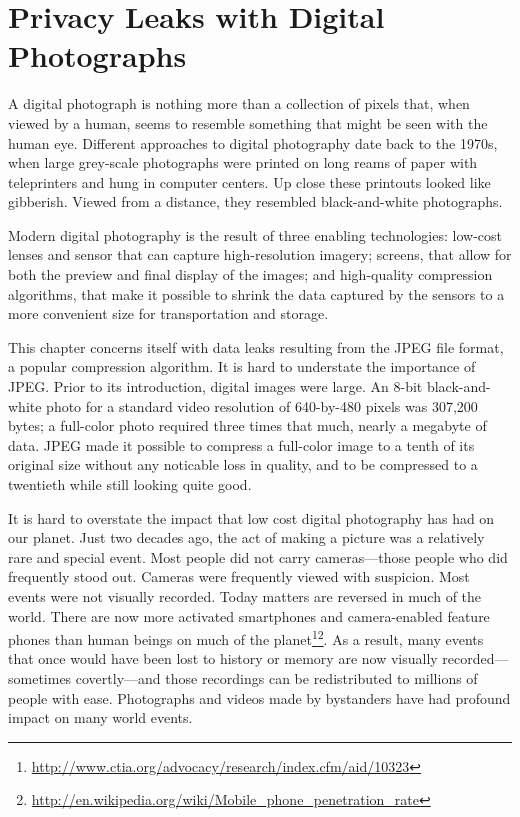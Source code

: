 \chapter{Privacy Leaks with Digital Photographs}

A digital photograph is nothing more than a collection of
pixels that, when viewed by a human, seems to resemble something that
might be seen with the human eye. Different approaches to digital
photography date back to the 1970s, when large grey-scale photographs
were printed on long reams of paper with teleprinters and hung in
computer centers. Up close these printouts looked like
gibberish. Viewed from a distance, they resembled black-and-white photographs.

Modern digital photography is the result of three enabling
technologies: low-cost lenses and sensor that can capture
high-resolution imagery; screens, that allow for both the preview and
final display of the images; and high-quality compression algorithms,
that make it possible to shrink the data captured by the sensors to a
more convenient size for transportation and storage.

This chapter concerns itself with data leaks resulting from the JPEG
file format, a popular compression algorithm. It is hard to understate
the importance of JPEG. Prior to its introduction, digital images were
large. An 8-bit black-and-white photo for a standard video resolution
of 640-by-480 pixels was 307,200 bytes; a full-color photo required
three times that much, nearly a megabyte of data. JPEG made it
possible to compress a full-color image to a tenth of its original
size without any noticable loss in quality, and to be compressed to a
twentieth while still looking quite good.

It is hard to overstate the impact that low cost digital photography
has had on our planet. Just two decades ago, the act of making a
picture was a relatively rare and special event. Most people did not
carry cameras---those people who did frequently stood out. Cameras
were frequently viewed with suspicion. Most events were not visually
recorded. Today matters are reversed in much of the world. There are
now more activated smartphones and camera-enabled feature phones than
human beings on much of the
planet\footnote{\url{http://www.ctia.org/advocacy/research/index.cfm/aid/10323}}\footnote{\url{http://en.wikipedia.org/wiki/Mobile_phone_penetration_rate}}. As
a result, many events that once would have been lost to history or
memory are now visually recorded---sometimes covertly---and those
recordings can be redistributed to millions of people with
ease. Photographs and videos made by bystanders have had profound
impact on many world events.

